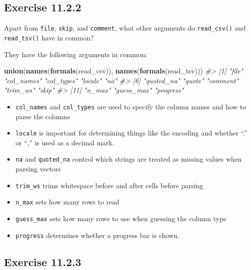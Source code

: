 \documentclass[]{book}
\newenvironment{Shaded}{\begin{snugshade}}{\end{snugshade}}
\newcommand{\CommentTok}[1]{\textcolor[rgb]{0.56,0.35,0.01}{\textit{#1}}}
\newcommand{\KeywordTok}[1]{\textcolor[rgb]{0.13,0.29,0.53}{\textbf{#1}}}
\newcommand{\NormalTok}[1]{#1}
\providecommand{\tightlist}{%
  \setlength{\itemsep}{0pt}\setlength{\parskip}{0pt}}
\theoremstyle{plain}
\theoremstyle{remark}
\begin{document}
\hypertarget{exercise-11.2.2}{%
\subsection*{\texorpdfstring{Exercise
{11.2.2}}{Exercise 11.2.2}}\label{exercise-11.2.2}}

Apart from \texttt{file}, \texttt{skip}, and \texttt{comment}, what
other arguments do \texttt{read\_csv()} and \texttt{read\_tsv()} have in
common?

They have the following arguments in common:

\begin{Shaded}
\begin{Highlighting}[]
\KeywordTok{union}\NormalTok{(}\KeywordTok{names}\NormalTok{(}\KeywordTok{formals}\NormalTok{(read_csv)), }\KeywordTok{names}\NormalTok{(}\KeywordTok{formals}\NormalTok{(read_tsv)))}
\CommentTok{#>  [1] "file"      "col_names" "col_types" "locale"    "na"       }
\CommentTok{#>  [6] "quoted_na" "quote"     "comment"   "trim_ws"   "skip"     }
\CommentTok{#> [11] "n_max"     "guess_max" "progress"}
\end{Highlighting}
\end{Shaded}

\begin{itemize}
\tightlist
\item
  \texttt{col\_names} and \texttt{col\_types} are used to specify the
  column names and how to parse the columns
\item
  \texttt{locale} is important for determining things like the encoding
  and whether ``.'' or ``,'' is used as a decimal mark.
\item
  \texttt{na} and \texttt{quoted\_na} control which strings are treated
  as missing values when parsing vectors
\item
  \texttt{trim\_ws} trims whitespace before and after cells before
  parsing
\item
  \texttt{n\_max} sets how many rows to read
\item
  \texttt{guess\_max} sets how many rows to use when guessing the column
  type
\item
  \texttt{progress} determines whether a progress bar is shown.
\end{itemize}

\hypertarget{exercise-11.2.3}{%
\subsection*{\texorpdfstring{Exercise
{11.2.3}}{Exercise 11.2.3}}\label{exercise-11.2.3}}
\end{document}
